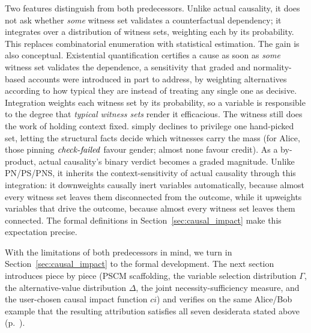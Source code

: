 Two features distinguish \ourapproach{} from both predecessors.
Unlike actual causality, it does not ask whether \emph{some} witness set validates a counterfactual dependency; it integrates over a distribution of witness sets, weighting each by its probability.
This replaces combinatorial enumeration with statistical estimation.
The gain is also conceptual. Existential quantification certifies a cause as soon as \emph{some} witness set validates the dependence, a sensitivity that graded and normality-based accounts were introduced in part to address, by weighting alternatives according to how typical they are instead of treating any single one as decisive. Integration weights each witness set by its probability, so a variable is responsible to the degree that \emph{typical witness sets} render it efficacious.
The witness still does the work of holding context fixed. \ourapproach{} simply declines to privilege one hand-picked set, letting the structural facts decide which witnesses carry the mass (for Alice, those pinning $\varname{check\text{-}failed}$ favour gender; almost none favour credit).
As a by-product, actual causality's binary verdict becomes a graded magnitude.
Unlike PN/PS/PNS, it inherits the context-sensitivity of actual causality through this integration: it downweights causally inert variables automatically, because almost every witness set leaves them disconnected from the outcome, while it upweights variables that drive the outcome, because almost every witness set leaves them connected.
The formal definitions in Section~\ref{sec:causal_impact} make this expectation precise.

\medskip\noindent With the limitations of both predecessors in mind, we turn
in Section~\ref{sec:causal_impact} to the formal development. The next section
introduces \ourapproach piece by piece (PSCM scaffolding, the variable
selection distribution $\Gamma$, the alternative-value distribution $\Delta$, the
joint necessity-sufficiency measure, and the user-chosen causal impact function
$ci$) and verifies on the same Alice/Bob example that the resulting attribution
satisfies all seven desiderata stated above (p.~\pageref{desid}).




